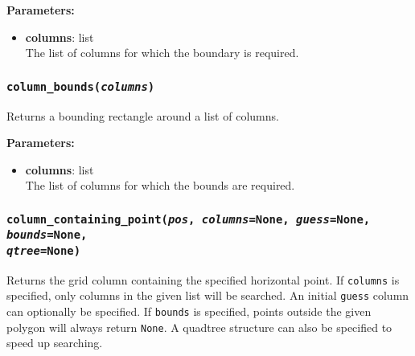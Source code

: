 \textbf{Parameters:}
\begin{itemize}
\item \textbf{columns}: list\\
  The list of columns for which the boundary is required.
\end{itemize}

\begin{snugshade}\subsubsection{\texttt{column\_bounds(\emph{columns})}}\end{snugshade}
\label{sec:mulgrid:column_bounds}

Returns a bounding rectangle around a list of columns.

\textbf{Parameters:}
\begin{itemize}
\item \textbf{columns}: list\\
  The list of columns for which the bounds are required.
\end{itemize}

\begin{snugshade}\subsubsection{\texttt{column\_containing\_point(\emph{pos}, \emph{columns}=None, \emph{guess}=None, \emph{bounds}=None,\\
\emph{qtree}=None)}}\end{snugshade}
\label{sec:mulgrid:column_containing_point}

Returns the grid column containing the specified horizontal point.  If \texttt{columns} is specified, only columns in the given list will be searched.  An initial \texttt{guess} column can optionally be specified.  If \texttt{bounds} is specified, points outside the given polygon will always return \texttt{None}.  A quadtree structure can also be specified to speed up searching.

